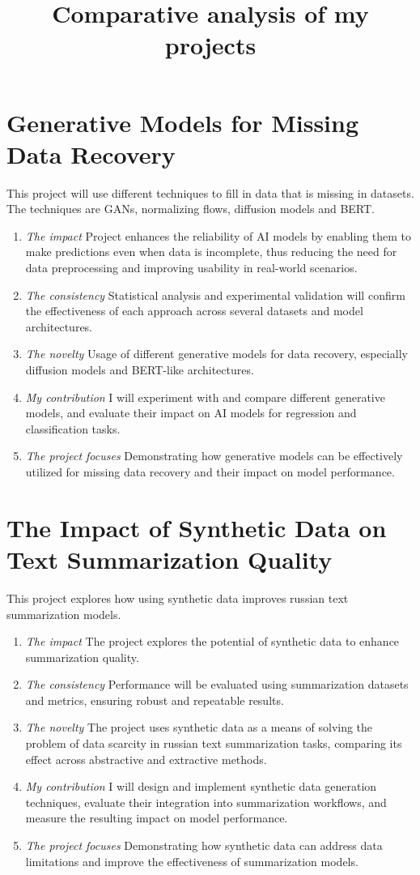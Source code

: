 \documentclass[12pt]{article}
\title{Comparative analysis of my projects}
\date{}
\begin{document}
\maketitle

\section{Generative Models for Missing Data Recovery}
This project will use different techniques to fill in data that is missing in datasets. The techniques are GANs, normalizing flows, diffusion models and BERT.
\begin{enumerate}
\item \emph{The impact} Project enhances the reliability of AI models by enabling them to make predictions even when data is incomplete, thus reducing the need for data preprocessing and improving usability in real-world scenarios.
\item \emph{The consistency} Statistical analysis and experimental validation will confirm the effectiveness of each approach across several datasets and model architectures.
\item \emph{The novelty} Usage of different generative models for data recovery, especially diffusion models and BERT-like architectures.
\item \emph{My contribution} I will experiment with and compare different generative models, and evaluate their impact on AI models for regression and classification tasks.
\item \emph{The project focuses} Demonstrating how generative models can be effectively utilized for missing data recovery and their impact on model performance.
\end{enumerate}

\section{The Impact of Synthetic Data on Text Summarization Quality}
This project explores how using synthetic data improves russian text summarization models.
\begin{enumerate}
\item \emph{The impact} The project explores the potential of synthetic data to enhance summarization quality.
\item \emph{The consistency} Performance will be evaluated using summarization datasets and metrics, ensuring robust and repeatable results.
\item \emph{The novelty} The project uses synthetic data as a means of solving the problem of data scarcity in russian text summarization tasks, comparing its effect across abstractive and extractive methods.
\item \emph{My contribution} I will design and implement synthetic data generation techniques, evaluate their integration into summarization workflows, and measure the resulting impact on model performance.
\item \emph{The project focuses} Demonstrating how synthetic data can address data limitations and improve the effectiveness of summarization models.
\end{enumerate}
\end{document}
